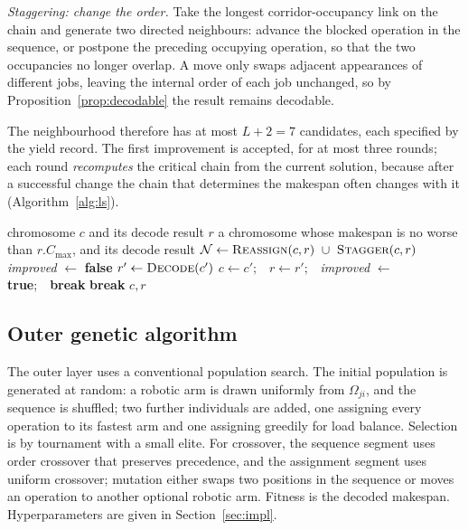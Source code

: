 \documentclass[manuscript,screen,review]{acmart}
\begin{document}
\emph{Staggering: change the order.} Take the longest corridor-occupancy link on the chain and generate two directed neighbours: advance the blocked operation in the sequence, or postpone the preceding occupying operation, so that the two occupancies no longer overlap.
A move only swaps adjacent appearances of different jobs, leaving the internal order of each job unchanged, so by Proposition~\ref{prop:decodable} the result remains decodable.

The neighbourhood therefore has at most $L+2=7$ candidates, each specified by the yield record. The first improvement is accepted, for at most three rounds; each round \emph{recomputes} the critical chain from the current solution, because after a successful change the chain that determines the makespan often changes with it (Algorithm~\ref{alg:ls}).

\begin{algorithm}[t]
\caption{\textsc{ContentionGuidedSearch}: yield-record-guided local search}
\label{alg:ls}
\small
\begin{algorithmic}[1]
\Require chromosome $c$ and its decode result $r$
\Ensure a chromosome whose makespan is no worse than $r.C_{\max}$, and its decode result
  \State $\mathcal{N}\gets\textsc{Reassign}(c,r)\ \cup\ \textsc{Stagger}(c,r)$
  \State \textit{improved} $\gets$ \textbf{false}
    \State $r'\gets\textsc{Decode}(c')$
      \State $c\gets c'$;\ \ $r\gets r'$;\ \ \textit{improved} $\gets$
             \textbf{true};\ \ \textbf{break}
    \EndIf
  \EndFor
   \State \textbf{break} \EndIf
\EndFor
\State \Return $c,r$
\end{algorithmic}
\end{algorithm}

\subsection{Outer genetic algorithm}

The outer layer uses a conventional population search.
The initial population is generated at random: a robotic arm is drawn uniformly from $\Omega_{ji}$, and the sequence is shuffled; two further individuals are added, one assigning every operation to its fastest arm and one assigning greedily for load balance.
Selection is by tournament with a small elite. For crossover, the sequence segment uses order crossover that preserves precedence, and the assignment segment uses uniform crossover; mutation either swaps two positions in the sequence or moves an operation to another optional robotic arm.
Fitness is the decoded makespan. Hyperparameters are given in Section~\ref{sec:impl}.
\end{document}
